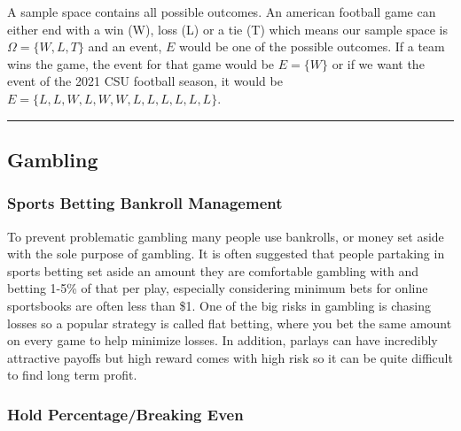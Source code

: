 \documentclass[]{article}
\begin{document}
A sample space contains all possible outcomes. An american football game
can either end with a win (W), loss (L) or a tie (T) which means our
sample space is \(\Omega = \{W,L,T \}\) and an event, \(E\) would be one
of the possible outcomes. If a team wins the game, the event for that
game would be \(E=\{W \}\) or if we want the event of the 2021 CSU
football season, it would be
\(E=\{ L, L, W, L, W, W, L, L, L, L, L, L \}\).

\begin{center}\rule{0.5\linewidth}{\linethickness}\end{center}

\hypertarget{gambling}{%
\subsection{Gambling}\label{gambling}}

\hypertarget{sports-betting-bankroll-management}{%
\subsubsection{Sports Betting Bankroll
Management}\label{sports-betting-bankroll-management}}

To prevent problematic gambling many people use bankrolls, or money set
aside with the sole purpose of gambling. It is often suggested that
people partaking in sports betting set aside an amount they are
comfortable gambling with and betting 1-5\% of that per play, especially
considering minimum bets for online sportsbooks are often less than \$1.
One of the big risks in gambling is chasing losses so a popular strategy
is called flat betting, where you bet the same amount on every game to
help minimize losses. In addition, parlays can have incredibly
attractive payoffs but high reward comes with high risk so it can be
quite difficult to find long term profit.

\hypertarget{hold-percentagebreaking-even}{%
\subsubsection{Hold Percentage/Breaking
Even}\label{hold-percentagebreaking-even}}
\end{document}
